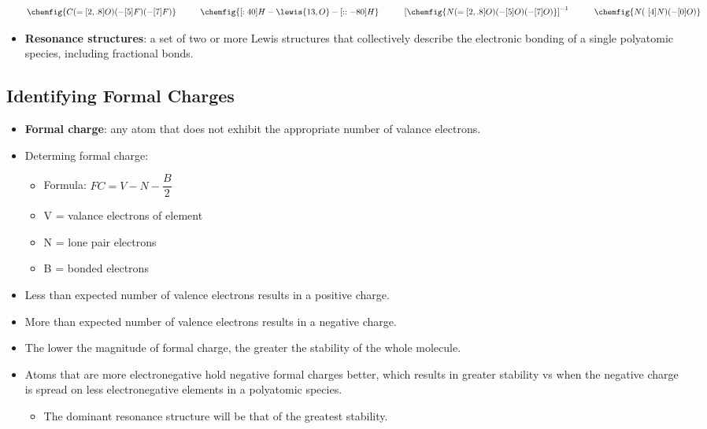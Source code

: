 \documentclass[12pt,a4paper]{article}
\begin{document}
\begin{itemize}
\begin{align*}
            \chemfig{C(=[2,.8]O)(-[5]F)(-[7]F)}
            \hspace{1cm}
            \chemfig{[:40]H-\lewis{13,O}-[::-80]H} 
            \hspace{1cm}
            \left[\chemfig{N(=[2,.8]O)(-[5]O)(-[7]O)}\right]^{-1} 
            \hspace{1cm}
            \chemfig{N(~[4]N)(-[0]O)}
        \end{align*}
    \item \textbf{Resonance structures}: a set of two or more Lewis structures that collectively describe the electronic bonding of a single polyatomic species, including fractional bonds.
\end{itemize}

\subsection{Identifying Formal Charges}
\begin{itemize}
    \item \textbf{Formal charge}: any atom that does not exhibit the appropriate number of valance electrons.
    \item Determing formal charge:
        \begin{itemize}
            \item Formula: {\color{o-Sun}\(FC = V - N - \dfrac{B}{2}\)}
            \item V = valance electrons of element
            \item N = lone pair electrons
            \item B = bonded electrons
        \end{itemize}
    \item {\color{pos}Less} than expected number of valence electrons results in a {\color{pos} positive} charge.
    \item {\color{neg}More} than expected number of valence electrons results in a {\color{neg}negative} charge.
    \item The lower the {\color{o-Sun}magnitude} of formal charge, the {\color{o-Sun}greater the stability} of the whole molecule.
    \item Atoms that are {\color{neg}more electronegative} hold {\color{neg}negative} formal charges better, which results in {\color{o-Sun}greater stability} vs when the negative charge is spread on less electronegative elements in a polyatomic species.
        \begin{itemize}
            \item The dominant resonance structure will be that of the greatest stability. 
        \end{itemize}
\end{itemize}
\end{document}
